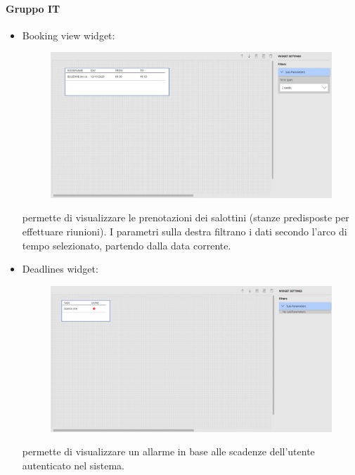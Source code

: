 \paragraph{Gruppo IT}
\begin{itemize}
    \item Booking view widget: 

\begin{figure}[ht]
\centering
\includegraphics[scale=0.32]{Images/BookingView.JPG}
\end{figure}
permette di visualizzare le prenotazioni dei salottini (stanze predisposte per effettuare riunioni). I parametri sulla destra filtrano i dati secondo l'arco di tempo selezionato, partendo dalla data corrente.
\end{itemize}
\pagebreak
\begin{itemize}
    \item Deadlines widget: 
    
\begin{figure}[ht]
\centering
\includegraphics[scale=0.35]{Images/Deadlines.png}
\end{figure}
permette di visualizzare un allarme in base alle scadenze dell'utente autenticato nel sistema.
\end{itemize}
